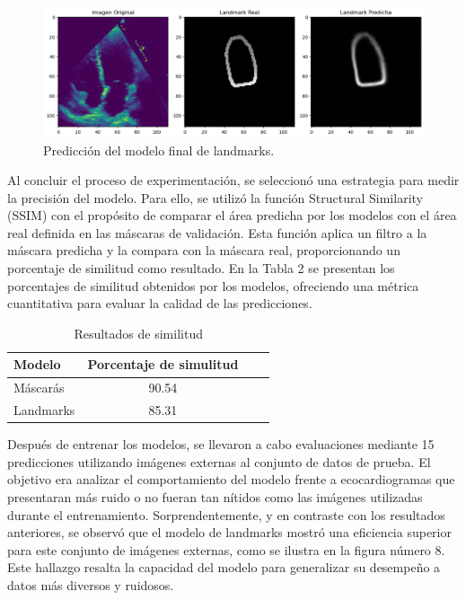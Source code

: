 \documentclass[runningheads]{llncs}
\begin{document}
\begin{figure}
    \centering
    \includegraphics[scale=0.3]{images/Landmark_prediction1.png}
    \caption{Predicción del modelo final de landmarks.}\label{fig:imagen1}
\end{figure}

Al concluir el proceso de experimentación, se seleccionó una estrategia para medir la precisión del modelo. Para ello, se utilizó la función Structural Similarity (SSIM) con el propósito de comparar el área predicha por los modelos con el área real definida en las máscaras de validación. Esta función aplica un filtro a la máscara predicha y la compara con la máscara real, proporcionando un porcentaje de similitud como resultado. En la Tabla 2 se presentan los porcentajes de similitud obtenidos por los modelos, ofreciendo una métrica cuantitativa para evaluar la calidad de las predicciones.

\vspace{-1em} %
\begin{table}
    \centering
    \begin{tabular}{lccc}
    \toprule
    Modelo & Porcentaje de simulitud \\
    \midrule
    Máscarás & 90.54\\
    Landmarks & 85.31\\
    \bottomrule
    \end{tabular}
    \vspace{1em} %
    \caption{Resultados de similitud}\label{tab2}
\end{table}

\vspace{-1em} %

Después de entrenar los modelos, se llevaron a cabo evaluaciones mediante 15 predicciones utilizando imágenes externas al conjunto de datos de prueba. El objetivo era analizar el comportamiento del modelo frente a ecocardiogramas que presentaran más ruido o no fueran tan nítidos como las imágenes utilizadas durante el entrenamiento. Sorprendentemente, y en contraste con los resultados anteriores, se observó que el modelo de landmarks mostró una eficiencia superior para este conjunto de imágenes externas, como se ilustra en la figura número 8. Este hallazgo resalta la capacidad del modelo para generalizar su desempeño a datos más diversos y ruidosos.
\end{document}
